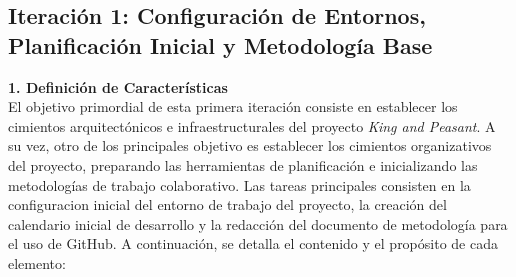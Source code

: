 \subsection{Iteración 1: Configuración de Entornos, Planificación Inicial y Metodología Base}

\textbf{1. Definición de Características} \\
El objetivo primordial de esta primera iteración consiste en establecer los cimientos arquitectónicos e infraestructurales del proyecto \textit{King and Peasant}. A su vez, otro de los principales objetivo es establecer los cimientos organizativos del proyecto, preparando las herramientas de planificación e inicializando las metodologías de trabajo colaborativo. Las tareas principales consisten en la configuracion inicial del entorno de trabajo del proyecto, la creación del calendario inicial de desarrollo y la redacción del documento de metodología para el uso de GitHub. A continuación, se detalla el contenido y el propósito de cada elemento:

